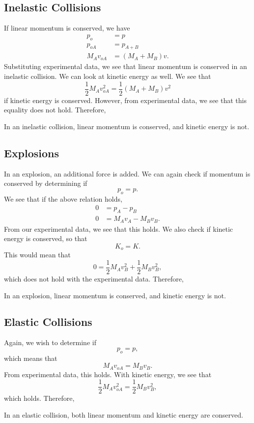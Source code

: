 \documentclass[11pt]{article}
\begin{document}
\subsection{Inelastic Collisions}
If linear momentum is conserved, we have
\begin{align*}
	p_o &= p \\
	p_{oA} &= p_{A+B} \\
	M_Av_{oA} &= (M_A + M_B)v.
\end{align*}
Substituting experimental data, we see that linear momentum is conserved in an inelastic collision.
We can look at kinetic energy as well. We see that
\[\frac{1}{2}M_A v_{oA}^2 = \frac{1}{2}(M_A + M_B) v^2\]
if kinetic energy is conserved. However, from experimental data, we see that this equality does not hold. Therefore,
\begin{law}
	In an inelastic collision, linear momentum is conserved, and kinetic energy is not.
\end{law}

\subsection{Explosions}
In an explosion, an additional force is added. We can again check if momentum is conserved by determining if
\[p_o = p.\]
We see that if the above relation holds,
\begin{align*}
	0 &= p_A-p_B \\
	0 &= M_Av_A - M_Bv_B.
\end{align*}
From our experimental data, we see that this holds. We also check if kinetic energy is conserved, so that
\[K_o = K.\]
This would mean that
\[0 = \frac{1}{2}M_Av_B^2 + \frac{1}{2}M_Bv_B^2,\]
which does not hold with the experimental data. Therefore,
\begin{law}
	In an explosion, linear momentum is conserved, and kinetic energy is not.
\end{law}

\subsection{Elastic Collisions}
Again, we wish to determine if
\[p_o = p,\]
which means that
\[M_Av_{oA} = M_Bv_B.\]
From experimental data, this holds. With kinetic energy, we see that
\[\frac{1}{2}M_Av_{oA}^2 = \frac{1}{2}M_Bv_B^2,\]
which holds. Therefore,
\begin{law}
	In an elastic collision, both linear momentum and kinetic energy are conserved.
\end{law}
\end{document}
